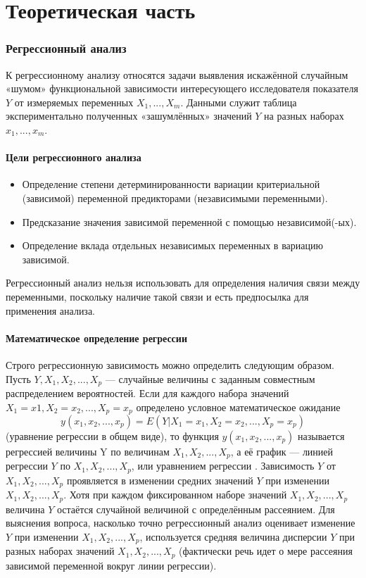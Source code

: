 \part{Теоретическая часть}

\section{Регрессионный анализ}

К регрессионному анализу относятся задачи выявления искажённой случайным «шумом» функциональной зависимости интересующего исследователя показателя $Y$ от измеряемых переменных $X_1,...,X_m$. Данными служит таблица экспериментально полученных «зашумлённых» значений $Y$ на разных наборах $x_1,...,x_m$. \cite{lag}

\subsection{Цели регрессионного анализа}

\begin{itemize}
\item Определение степени детерминированности вариации критериальной (зависимой) переменной предикторами (независимыми переменными).
\item Предсказание значения зависимой переменной с помощью независимой(-ых).
\item Определение вклада отдельных независимых переменных в вариацию зависимой.
\end{itemize}

Регрессионный анализ нельзя использовать для определения наличия связи между переменными, поскольку наличие такой связи и есть предпосылка для применения анализа.

\subsection{Математическое определение регрессии}

Строго регрессионную зависимость можно определить следующим образом. Пусть $Y, X_1, X_2,...,X_p$  — случайные величины с заданным совместным распределением вероятностей. Если для каждого набора значений $X_1=x1,X_2=x_2,...,X_p=x_p$ определено условное математическое ожидание
\begin{equation}
y(x_1,x_2,...,x_p) = E(Y|X_1 = x_1, X_2 = x_2, ..., X_p = x_p)
\end{equation}
(уравнение регрессии в общем виде), то функция $y(x_1,x_2,...,x_p)$ называется регрессией величины Y по величинам $X_1,X_2,...,X_p$, а её график — линией регрессии $Y$ по $X_1,X_2,...,X_p$, или уравнением регрессии \cite{applregr}.
Зависимость $Y$ от $X_1,X_2,...,X_p$ проявляется в изменении средних значений $Y$ при изменении $X_1,X_2,...,X_p$. Хотя при каждом фиксированном наборе значений $X_1,X_2,...,X_p$ величина $Y$ остаётся случайной величиной с определённым рассеянием.
Для выяснения вопроса, насколько точно регрессионный анализ оценивает изменение $Y$ при изменении $X_1,X_2,...,X_p$, используется средняя величина дисперсии $Y$ при разных наборах значений $X_1,X_2,...,X_p$ (фактически речь идет о мере рассеяния зависимой переменной вокруг линии регрессии).

